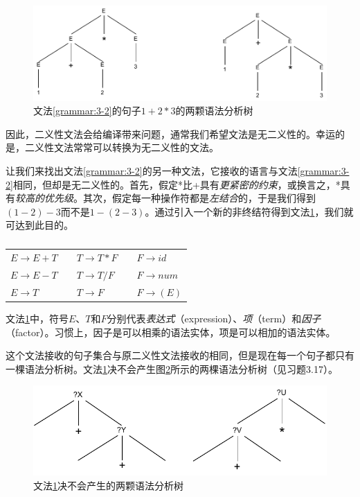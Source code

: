 \documentclass[cn,11pt,chinese]{elegantbook}
\begin{document}
\begin{figure}[htbp]
  \centering
  \includegraphics[width=.8\textwidth]{3-7.pdf}
  \caption{文法\ref{grammar:3-2}的句子$1+2*3$的两颗语法分析树}
  \label{fig:3-7}
\end{figure}

因此，二义性文法会给编译带来问题，通常我们希望文法是无二义性的。幸运的是，二义性文法常常可以转换为无二义性的文法。

让我们来找出文法\ref{grammar:3-2}的另一种文法，它接收的语言与文法\ref{grammar:3-2}相同，但却是无二义性的。首先，假定*比+具有\textit{更紧密的约束}，或换言之，*具有\textit{较高的优先级}。其次，假定每一种操作符都是\textit{左结合}的，于是我们得到$(1-2)-3$而不是$1-(2-3)$。通过引入一个新的非终结符得到文法\ref{grammar:3-3}，我们就可达到此目的。

\renewcommand\tablename{文法}
\begin{table}[htbp]
  \centering
  \begin{tabular}{lllll}
    \toprule
    $E\rightarrow E+T$ & \quad & $T\rightarrow T*F$ & \quad & $F\rightarrow id$ \\
    $E\rightarrow E-T$ & \quad & $T\rightarrow T/F$ & \quad & $F\rightarrow num$ \\
    $E\rightarrow T$   & \quad & $T\rightarrow F$   & \quad & $F\rightarrow (E)$ \\
    \bottomrule
  \end{tabular}
  \caption{}
  \label{grammar:3-3}
\end{table}
\renewcommand\tablename{表}

文法\ref{grammar:3-3}中，符号$E$、$T$和$F$分别代表\textit{表达式}（expression）、\textit{项}（term）和\textit{因子}（factor）。习惯上，因子是可以相乘的语法实体，项是可以相加的语法实体。

这个文法接收的句子集合与原二义性文法接收的相同，但是现在每一个句子都只有一棵语法分析树。文法\ref{grammar:3-3}决不会产生图\ref{fig:3-9}所示的两棵语法分析树（见习题3.17）。

\begin{figure}[htbp]
  \centering
  \includegraphics[width=.8\textwidth]{3-9.pdf}
  \caption{文法\ref{grammar:3-3}决不会产生的两颗语法分析树}
  \label{fig:3-9}
\end{figure}
\end{document}
